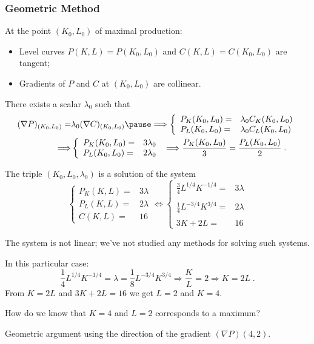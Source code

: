 \begin{frame}
  \frametitle{Geometric Method}

  At the point $(K_0,L_0)$ of maximal production:\pause

\begin{itemize}
  \item Level curves $P(K,L) = P(K_0,L_0)$ and $C(K,L) = C(K_0,L_0)$ are tangent;\pause
  \item Gradients of $P$ and $C$ at $(K_0,L_0)$ are  collinear.
\end{itemize}

\pause There exists a scalar $\lambda_0$ such that
%
\begin{align*}
  (\nabla P)_{(K_0,L_0)} = & \lambda_0 (\nabla C)_{(K_0,L_0)} \pause \Longrightarrow
\left\{ \begin{array}{ll}
  P_K(K_0,L_0) = & \lambda_0 C_K(K_0,L_0) \\
  P_L(K_0,L_0) = & \lambda_0 C_L(K_0,L_0)
\end{array}
\right. \\
\Longrightarrow & \left\{ \begin{array}{ll}
  P_K(K_0,L_0) = & 3 \lambda_0 \\
  P_L(K_0,L_0) = & 2 \lambda_0
\end{array}
\right. \; \Longrightarrow \frac{P_K(K_0,L_0)}{3}=\frac{P_L(K_0,L_0)}{2}\; .
\end{align*}
%
\end{frame}

\begin{frame}
  The triple $(K_0,L_0,\lambda_0)$ is a solution of the system
%
$$\left\{ \begin{array}{ll}
  P_K(K,L) = & 3\lambda\\
  P_L(K,L) = & 2\lambda  \\
  C(K,L) = & 16
\end{array} \right.
%
\Longleftrightarrow
%
\left\{ \begin{array}{ll}
  \frac{3}{4} L^{1/4}K^{-1/4} = & 3\lambda\\
  & \\
  \frac{1}{4} L^{-3/4}K^{3/4} = & 2\lambda  \\
  & \\
  3K+2L = & 16
\end{array} \right.
$$

\pause
The system is not linear; we've not studied any methods for solving such systems. \pause

In this particular case:
%
$$\frac{1}{4} L^{1/4}K^{-1/4} = \lambda = \frac{1}{8} L^{-3/4}K^{3/4} \Longrightarrow \frac{K}{L}=2 \Longrightarrow K = 2L\; .$$
%
From $K=2L$ and $3K+2L=16$ we get \pause $L=2$ and $K=4$.\pause

How do we know that $K=4$ and $L=2$ corresponds to a maximum? \pause

Geometric argument using the direction of the gradient $(\nabla P)(4,2)$.

\end{frame}